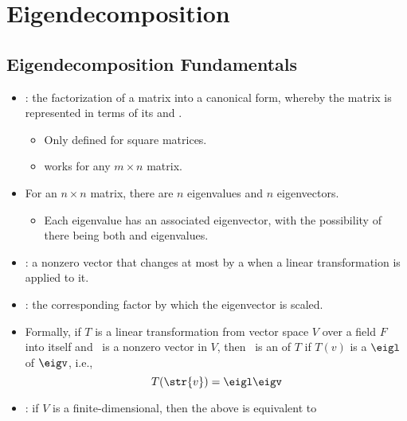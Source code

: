 \chapter{Eigendecomposition}\label{Eigendecomposition}

\section{Eigendecomposition Fundamentals}\label{Eigendecomposition Fundamentals}
\begin{itemize}
  \item {}: the factorization of a matrix into a canonical form, whereby the matrix is represented in terms of its  and .
    \begin{itemize}
      \item Only defined for square matrices.
      \item \hyperref[Singular Value Decomposition]{} works for any \(m\times n\) matrix.
    \end{itemize}
  \item For an \(n \times n\) matrix, there are \(n\) eigenvalues and \(n\) eigenvectors.
    \begin{itemize}
      \item Each eigenvalue has an associated eigenvector, with the possibility of there being both \hyperref[Eigenvectors of Distinct Eigenvalues]{} and \hyperref[Eigenvectors of Repeated Eigenvalues]{} eigenvalues.
    \end{itemize}
  \item \textbf{}: a nonzero vector that changes at most by a \hyperref[Vector Scalar Multiplication]{} when a linear transformation is applied to it. 
  \item \textbf{}: the corresponding factor by which the eigenvector is scaled.
  \item Formally, if \(T\) is a linear transformation from vector space \(V\) over a field \(F\) into itself and \eigv~is a nonzero vector in \(V\), then \eigv~is an  of \(T\) if \(T(v)\) is a  \(\eigl \) of \(\eigv \), i.e.,
  \[%
  T(\str{v}) = \eigl \eigv
  \]%
  \item {}: if \(V\) is a finite-dimensional, then the above is equivalent to

\end{itemize}
